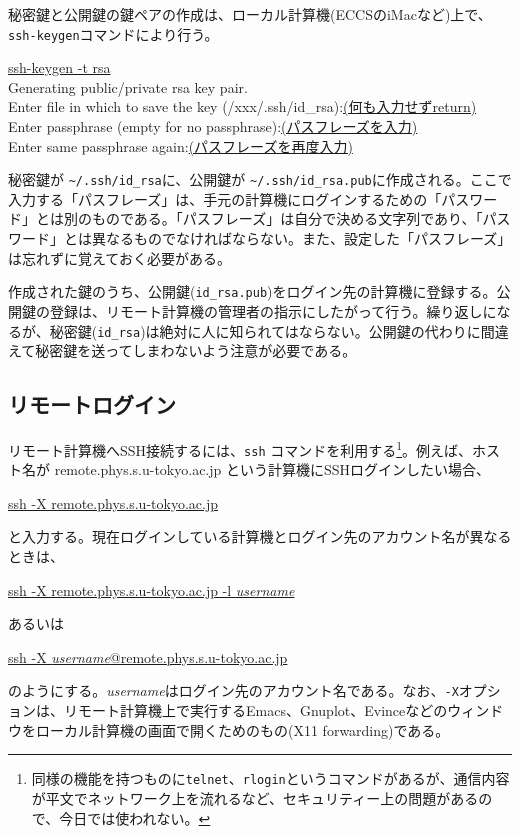 秘密鍵と公開鍵の鍵ペアの作成は、ローカル計算機(ECCSのiMacなど)上で、\texttt{ssh-keygen}コマンドにより行う。
\begin{commandline2}
    \prompt \underline{ssh-keygen -t rsa} \\
    Generating public/private rsa key pair.\\
    Enter file in which to save the key (/xxx/.ssh/id\_rsa):\underline{(何も入力せずreturn)}\\
    Enter passphrase (empty for no passphrase):\underline{(パスフレーズを入力)}\\
    Enter same passphrase again:\underline{(パスフレーズを再度入力)}
\end{commandline2} \noindent
秘密鍵が \texttt{\~{}/.ssh/id\_rsa}に、公開鍵が \texttt{\~{}/.ssh/id\_rsa.pub}に作成される。ここで入力する「パスフレーズ」は、手元の計算機にログインするための「パスワード」とは別のものである。「パスフレーズ」は自分で決める文字列であり、「パスワード」とは異なるものでなければならない。また、設定した「パスフレーズ」は忘れずに覚えておく必要がある。

作成された鍵のうち、公開鍵(\texttt{id\_rsa.pub})をログイン先の計算機に登録する。公開鍵の登録は、リモート計算機の管理者の指示にしたがって行う。繰り返しになるが、秘密鍵(\texttt{id\_rsa})は絶対に人に知られてはならない。公開鍵の代わりに間違えて秘密鍵を送ってしまわないよう注意が必要である。

\subsection{リモートログイン}

リモート計算機へSSH接続するには、\texttt{ssh} コマンドを利用する\footnote{同様の機能を持つものに\texttt{telnet}、\texttt{rlogin}というコマンドがあるが、通信内容が平文でネットワーク上を流れるなど、セキュリティー上の問題があるので、今日では使われない。}。例えば、ホスト名が remote.phys.s.u-tokyo.ac.jp という計算機にSSHログインしたい場合、
\begin{commandline2}
    \prompt \underline{ssh -X remote.phys.s.u-tokyo.ac.jp}
\end{commandline2} \noindent
と入力する。現在ログインしている計算機とログイン先のアカウント名が異なるときは、
\begin{commandline2}
    \prompt \underline{ssh -X remote.phys.s.u-tokyo.ac.jp -l \textit{username}}
\end{commandline2} \noindent
あるいは
\begin{commandline2}
    \prompt \underline{ssh -X \textit{username}@remote.phys.s.u-tokyo.ac.jp}
\end{commandline2} \noindent
のようにする。\textit{username}はログイン先のアカウント名である。なお、\texttt{-X}オプションは、リモート計算機上で実行するEmacs、Gnuplot、Evinceなどのウィンドウをローカル計算機の画面で開くためのもの(X11 forwarding)である。


